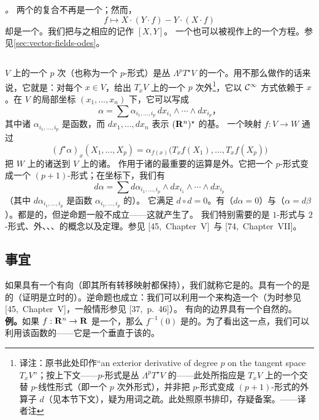 \emph{\trLieBracket。}
两个\trDerivation{}的复合不再是一个\trDerivation；然而，
\[
f\longmapsto X\cdot(Y\cdot f)-Y\cdot(X\cdot f)
\]
却是一个。我们把与之相应的\trVectorField{}记作 $[X,Y]$。
一个\trVectorField{}也可以被视作\trManifold{}上的一个\trDifferential{}方程。参见\cref{sec:vector-fields-odes}。

\subsection{\trDifferential\trForm}
\label{subsec:differential-forms}

\trManifold{} $V$ 上的一个 $p$ 次\trDifferential\trForm{}（也称为一个 $p$-形式）是丛 $\Lambda^{p}T^{\star}V$ 的一个\trSection。用不那么做作的话来说，它就是：对每个 $x\in V$，给出 $T_{x}V$ 上的一个 $p$ 次外\trDifferential\footnote{译注：原书此处印作“an exterior derivative of degree $p$ on the tangent space $T_{x}V$”；按上下文——$p$-形式是丛 $\Lambda^{p}T^{\star}V$ 的\trSection——此处所指应是 $T_{x}V$ 上的一个交替 $p$-线性形式（即一个 $p$ 次外形式），并非把 $p$-形式变成 $(p+1)$-形式的外\trDifferential{}算子 $d$（见本节下文），疑为用词之疏。此处照原书排印，存疑备案。——译者注}，它以 $\mathcal{C}^{\infty}$ 方式依赖于 $x$。在 $V$ 的局部坐标 $(x_{1},\dotsc,x_{n})$ 下，它可以写成
\[
\alpha=\sum\alpha_{i_{1},\dotsc,i_{p}}\,dx_{i_{1}}\wedge\dotsb\wedge dx_{i_{p}}\text{，}
\]
其中诸 $\alpha_{i_{1},\dotsc,i_{p}}$ 是函数，而 $dx_{1},\dotsc,dx_{n}$ 表示 $(\mathbf{R}^{n})^{\star}$ 的\trCanonical{}基。
一个映射 $f:V\to W$ 通过
\[
(f^{\star}\alpha)_{x}(X_{1},\dotsc,X_{p})=\alpha_{f(x)}\bigl(T_{x}f(X_{1}),\dotsc,T_{x}f(X_{p})\bigr)
\]
把 $W$ 上的诸\trDifferential\trForm{}送到 $V$ 上的诸\trDifferential\trForm。
作用于诸\trDifferential\trForm{}的最重要的运算是外\trDifferential。它把一个 $p$-形式变成一个 $(p+1)$-形式；在坐标下，我们有
\[
d\alpha=\sum d\alpha_{i_{1},\dotsc,i_{p}}\wedge dx_{i_{1}}\wedge\dotsb\wedge dx_{i_{p}}
\]
（其中 $d\alpha_{i_{1},\dotsc,i_{p}}$ 是函数 $\alpha_{i_{1},\dotsc,i_{p}}$ 的\trDifferential）。
它满足 $d\circ d=0$。有\trClosed\trForm（$d\alpha=0$）与\trExact\trForm（$\alpha=d\beta$）。\trExact\trForm{}都是\trClosed{}的，但逆命题一般不成立——这就产生了\trRham\trCohomology。
我们特别需要的是 $1$-形式与 $2$-形式、外\trDifferential、\trClosed\trForm、\trExact\trForm、\trVolume\trForm{}的概念以及\trStokes{}定理。参见 [45,~Chapter~V]~与 [74,~Chapter~VII]。

\subsection{\trOrientation{}事宜}
\label{subsec:orientation-matters}

如果\trManifold{}具有一个有向\trAtlas（即其所有转移映射都保持\trOrientation），我们就称它是\trOrientable{}的。具有一个\trVolume\trForm{}的\trManifold{}是\trOrientable{}的（证明是立时的）。逆命题也成立：我们可以利用一个\trPartitionOfUnity{}来构造一个\trVolume\trForm（\trManifold{}为\trCompact{}时参见 [45,~Chapter~V]，一般情形参见 [37,~p.~46]）。
有向\trManifold{}的边界具有一个自然的\trOrientation。
\noindent\textbf{例。}如果 $f:\mathbf{R}^{n}\to\mathbf{R}$ 是一个\trSubmersion，那么\trSubmanifold{} $f^{-1}(0)$ 是\trOrientable{}的。为了看出这一点，我们可以利用该函数的\trGradient——它是一个垂直于该\trSubmanifold{}的\trVectorField。
